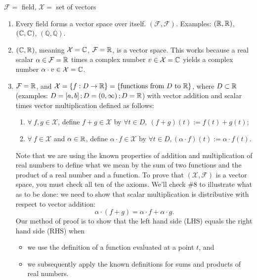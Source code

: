 \vspace*{.2cm}

\begin{example} 
 $\mathcal{F} = $ field, $\mathcal{X} = $ set of vectors
    \begin{enumerate}
        \item Every field forms a vector space over itself. $\left(\mathcal{F},\mathcal{F}\right)$. Examples: $\left(\mathbb R,\mathbb R\right)$, $\left(\mathbb C,\mathbb C\right)$, $\left(\mathbb{Q},\mathbb{Q}\right)$.
        \item $\left(\mathbb C,\mathbb R\right)$, meaning $\mathcal{X} = \mathbb C$, $\mathcal{F} = \mathbb R$, is a vector space. This works because a real scalar $\alpha \in \mathcal{F}=\mathbb R$ times a complex number $v \in \mathcal{X}=\mathbb C$ yields a complex number $\alpha \cdot v \in \mathcal{X}=\mathbb C$. 
        \item $\mathcal{F} = \mathbb R$, and $\mathcal{X} = \left\{f:D\to\mathbb R\right\} = \left\{\mbox{functions from } D \mbox{ to } \mathbb R \right\}$, where $D \subset \mathbb R$ (examples: $D = \left[a,b\right]; D = \left(0,\infty\right); D = \mathbb R$) with vector addition and scalar times vector multiplication defined as follows:
        \begin{enumerate}
            \item $\forall~ f,g\in\mathcal{X}$, define $f+g \in \mathcal{X}$ by $\forall t\in D,\ \left(f+g\right)(t) := f(t) + g(t)$;
            \item  $\forall~ f \in\mathcal{X}$ and $\alpha\in\mathbb R$, define $\alpha\cdot f\in\mathcal{X}$ by $\forall t\in D, \left(\alpha\cdot f\right)(t) := \alpha\cdot f(t)$.
            \end{enumerate}
            Note that we are using the known properties of addition and multiplication of real numbers to define what we mean by the sum of two functions and the product of a real number and a function. To prove that $(\mathcal{X}, \mathcal{F})$ is a vector space, you must check all ten of the axioms. We'll check \#8 to illustrate what as to be done: we need to show that  scalar multiplication is distributive with respect to vector addition: 
            $$\alpha \cdot (f + g) = \alpha \cdot f + \alpha \cdot g.$$ 
            Our method of proof is to show that the left hand side (LHS) equals the right hand side (RHS) when 
            \begin{itemize}
                \item we use the definition of a function evaluated at a point $t$, and
                \item we subsequently apply the known definitions for sums and products of real numbers.

\end{itemize}
\end{enumerate}
\end{example}
